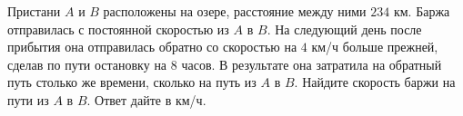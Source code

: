 \begin{ex}
	\begin{condition}
		Пристани \( A  \) и \( B  \) расположены на озере, расстояние между ними \(234\) км. Баржа отправилась с постоянной скоростью из \( A  \) в \( B \). На следующий день после прибытия она отправилась обратно со скоростью на \(4\) км/ч больше прежней, сделав по пути остановку на \(8\) часов. В результате она затратила на обратный путь столько же времени, сколько на путь из \(A\) в \(B\). Найдите скорость баржи на пути из \(A\)  в \(B\). Ответ дайте в км/ч.
	\end{condition}
\end{ex}